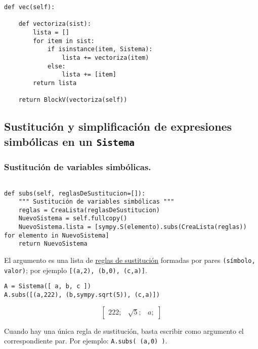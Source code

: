 \documentclass[11pt]{report}
\begin{document}
\begin{verbatim}
def vec(self):
    
    def vectoriza(sist):
        lista = []
        for item in sist:
            if isinstance(item, Sistema):
                lista += vectoriza(item)                
            else:
                lista += [item]
        return lista
    
    return BlockV(vectoriza(self))
\end{verbatim}

\subsection{Sustitución y simplificación de expresiones simbólicas en un \texttt{Sistema}}
\label{sec:org7fa7df1}

\subsubsection{Sustitución de variables simbólicas.}
\label{sec:orgd3a56e2}

\begin{verbatim}

def subs(self, reglasDeSustitucion=[]):
    """ Sustitución de variables simbólicas """
    reglas = CreaLista(reglasDeSustitucion)
    NuevoSistema = self.fullcopy()
    NuevoSistema.lista = [sympy.S(elemento).subs(CreaLista(reglas)) for elemento in NuevoSistema]
    return NuevoSistema

\end{verbatim}

El argumento es una lista de \href{https://docs.sympy.org/latest/tutorials/intro-tutorial/basic\_operations.html}{reglas de sustitución} formadas por pares
\texttt{(símbolo, valor)}; por ejemplo \texttt{[(a,2), (b,0), (c,a)]}.

\begin{verbatim}
A = Sistema([ a, b, c ])
A.subs([(a,222), (b,sympy.sqrt(5)), (c,a)])
\end{verbatim}

$$\left[ \begin{array}{ccc}222;& \sqrt{5};& a;\end{array} \right]$$

Cuando hay una única regla de sustitución, basta escribir como
argumento el correspondiente par. Por ejemplo: \texttt{A.subs( (a,0) )}.
\end{document}
